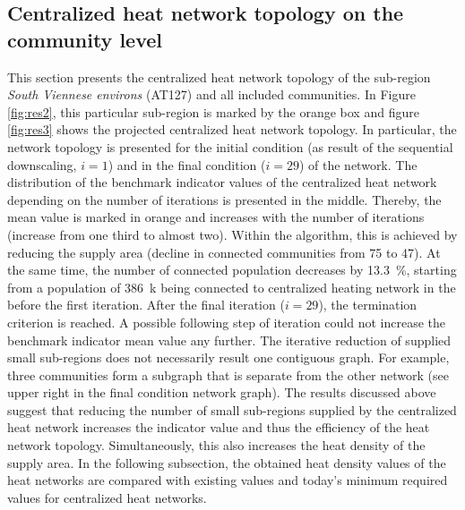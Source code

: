 \subsection{Centralized heat network topology on the community level}\label{res:4}
This section presents the centralized heat network topology of the sub-region \textit{South Viennese environs} (AT127) and all included communities. In Figure \ref{fig:res2}, this particular sub-region is marked by the orange box and figure \ref{fig:res3} shows the projected centralized heat network topology. In particular, the network topology is presented for the initial condition (as result of the sequential downscaling, $i=1$) and in the final condition ($i=29$) of the network. The distribution of the benchmark indicator values of the centralized heat network depending on the number of iterations is presented in the middle. Thereby, the mean value is marked in orange and increases with the number of iterations (increase from one third to almost two). Within the algorithm, this is achieved by reducing the supply area (decline in connected communities from 75 to 47). At the same time, the number of connected population decreases by \SI{13.3}{\%}, starting from a population of \SI{386}{k} being connected to centralized heating network in the before the first iteration. After the final iteration ($i=29$), the termination criterion is reached. A possible following step of iteration could not increase the benchmark indicator mean value any further. The iterative reduction of supplied small sub-regions does not necessarily result one contiguous graph. For example, three communities form a subgraph that is separate from the other network (see upper right in the final condition network graph). The results discussed above suggest that reducing the number of small sub-regions supplied by the centralized heat network increases the indicator value and thus the efficiency of the heat network topology. Simultaneously, this also increases the heat density of the supply area. In the following subsection, the obtained heat density values of the heat networks are compared with existing values and today's minimum required values for centralized heat networks.

